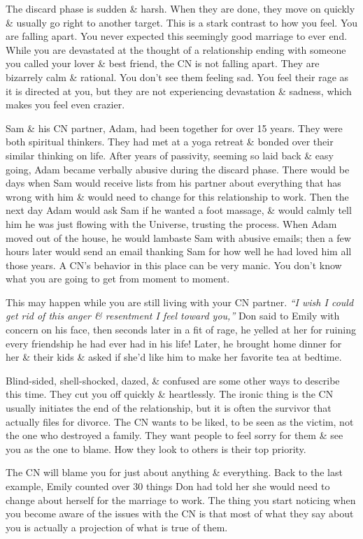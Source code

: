 \documentclass{article}
\numberwithin{equation}{section}
\begin{document}
The discard phase is sudden \& harsh. When they are done, they move on quickly \& usually go right to another target. This is a stark contrast to how you feel. You are falling apart. You never expected this seemingly good marriage to ever end. While you are devastated at the thought of a relationship ending with someone you called your lover \& best friend, the CN is not falling apart. They are bizarrely calm \& rational. You don't see them feeling sad. You feel their rage as it is directed at you, but they are not experiencing devastation \& sadness, which makes you feel even crazier.

Sam \& his CN partner, Adam, had been together for over 15 years. They were both spiritual thinkers. They had met at a yoga retreat \& bonded over their similar thinking on life. After years of passivity, seeming so laid back \& easy going, Adam became verbally abusive during the discard phase. There would be days when Sam would receive lists from his partner about everything that has wrong with him \& would need to change for this relationship to work. Then the next day Adam would ask Sam if he wanted a foot massage, \& would calmly tell him he was just flowing with the Universe, trusting the process. When Adam moved out of the house, he would lambaste Sam with abusive emails; then a few hours later would send an email thanking Sam for how well he had loved him all those years. A CN's behavior in this place can be very manic. You don't know what you are going to get from moment to moment.

This may happen while you are still living with your CN partner. \textit{``I wish I could get rid of this anger \& resentment I feel toward you,''} Don said to Emily with concern on his face, then seconds later in a fit of rage, he yelled at her for ruining every friendship he had ever had in his life! Later, he brought home dinner for her \& their kids \& asked if she'd like him to make her favorite tea at bedtime.

Blind-sided, shell-shocked, dazed, \& confused are some other ways to describe this time. They cut you off quickly \& heartlessly. The ironic thing is the CN usually initiates the end of the relationship, but it is often the survivor that actually files for divorce. The CN wants to be liked, to be seen as the victim, not the one who destroyed a family. They want people to feel sorry for them \& see you as the one to blame. How they look to others is their top priority.

The CN will blame you for just about anything \& everything. Back to the last example, Emily counted over 30 things Don had told her she would need to change about herself for the marriage to work. The thing you start noticing when you become aware of the issues with the CN is that most of what they say about you is actually a projection of what is true of them.
\end{document}
